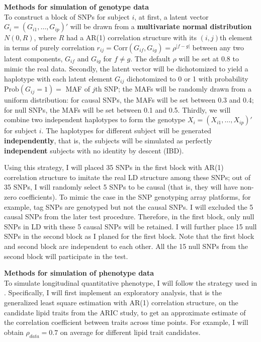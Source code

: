 \documentclass[12pt]{article}
\begin{document}
\textbf{Methods for simulation of genotype data}\\
To construct a block of SNPs for subject $i$, at first, a latent vector $G_i = (G_{i1}, \ldots, G_{ip})'$ will be drawn from a \textbf{multivariate normal distribution} $N(0,R)$, where $R$ had a AR(1) correlation structure with its $(i,j)$th element in terms of purely correlation $r_{ij} =\textrm{Corr} (G_{if}, G_{ig}) = \rho ^ { |f - g| }$ between any two latent components, $G_{if}$ and $G_{ig}$ for $f \neq g$. The default $\rho$ will be set at  $0.8$ to mimic the real data. Secondly, the latent vector will be dichotomized to yield a haplotype with each latent element $G_{ij}$ dichotomized to 0 or 1 with probability $\textrm{Prob} (G_{ij} = 1) = $ MAF of $j$th SNP; the MAFs will be randomly drawn from a uniform distribution: for causal SNPs, the MAFs will be set between 0.3 and 0.4; for null SNPs, the MAFs will be set between 0.1 and 0.5. Thirdly, we will combine two independent haplotypes to form the genotype $X_i = (X_{i1}, \ldots, X_{ip})' $ for subject $i$. The haplotypes for different subject will be generated \textbf{independently}, that is, the subjects will be simulated as perfectly \textbf{independent} subjects with no identity by descent (IBD). 

Using this strategy, I will placed 35 SNPs in the first block with AR(1) correlation structure to imitate the real LD structure among these SNPs; out of 35 SNPs, I will randomly select 5 SNPs to be causal (that is, they will have non-zero coefficients). To mimic the case in the SNP genotyping array platforms, for example, tag SNPs are genotyped but not the causal SNPs. I will excluded the 5 causal SNPs from the later test procedure. Therefore, in the first block, only null SNPs in LD with these 5 causal SNPs will be retained. I will further place 15 null SNPs in the second block as I planed for the first block. Note that the first block and second block are independent to each other. All the 15 null SNPs from the second block will participate in the test.

\textbf{Methods for simulation of phenotype data}\\
To simulate longitudinal quantitative phenotype, I will follow the strategy used in \cite{Song2013}. Specifically, I will first implement an exploratory analysis, that is the generalized least square estimation with AR(1) correlation structure, on the candidate lipid traits from the ARIC study, to get an approximate estimate of the correlation coefficient between traits across time points. For example, I will obtain $\rho_{data} = 0.7$ on average for different lipid trait candidates. 
\end{document}
